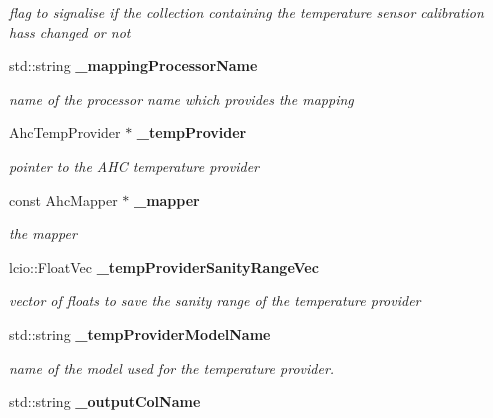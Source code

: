 \begin{DoxyCompactItemize}
\begin{DoxyCompactList}\small\item\em flag to signalise if the collection containing the temperature sensor calibration hass changed or not \end{DoxyCompactList}\item 
std\-::string {\bf \-\_\-mapping\-Processor\-Name}\label{classCALICE_1_1SiPMTemperatureProcessor_a1068bf0ac9a36c77aeefaf03514bd5e8}

\begin{DoxyCompactList}\small\item\em name of the processor name which provides the mapping \end{DoxyCompactList}\item 
Ahc\-Temp\-Provider $\ast$ {\bf \-\_\-temp\-Provider}\label{classCALICE_1_1SiPMTemperatureProcessor_ab874014a3ab396472b48b7533c9316b5}

\begin{DoxyCompactList}\small\item\em pointer to the A\-H\-C temperature provider \end{DoxyCompactList}\item 
const Ahc\-Mapper $\ast$ {\bf \-\_\-mapper}\label{classCALICE_1_1SiPMTemperatureProcessor_addf40c4cb0947b2bb138012bfcf31de6}

\begin{DoxyCompactList}\small\item\em the mapper \end{DoxyCompactList}\item 
lcio\-::\-Float\-Vec {\bf \-\_\-temp\-Provider\-Sanity\-Range\-Vec}\label{classCALICE_1_1SiPMTemperatureProcessor_a0bb6fba3c3e3cab14180259a473fe526}

\begin{DoxyCompactList}\small\item\em vector of floats to save the sanity range of the temperature provider \end{DoxyCompactList}\item 
std\-::string {\bf \-\_\-temp\-Provider\-Model\-Name}
\begin{DoxyCompactList}\small\item\em name of the model used for the temperature provider. \end{DoxyCompactList}\item 
std\-::string {\bf \-\_\-output\-Col\-Name}\label{classCALICE_1_1SiPMTemperatureProcessor_a583ed1ec93ef7e553c95ea291b51cb55}


\end{DoxyCompactItemize}
